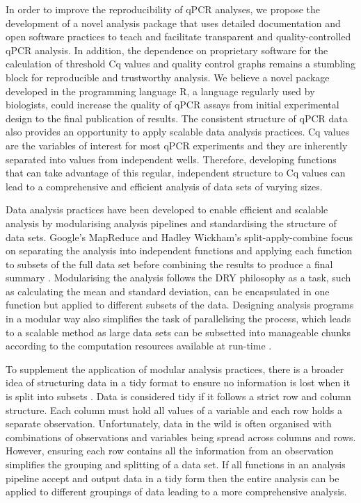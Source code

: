 \documentclass[../main.tex]{subfiles}
\begin{document}
In order to improve the reproducibility of qPCR analyses, we propose the development of a novel analysis package that uses detailed documentation and open software practices to teach and facilitate transparent and quality-controlled qPCR analysis. 
In addition, the dependence on proprietary software for the calculation of threshold Cq values and quality control graphs remains a stumbling block for reproducible and trustworthy analysis. 
We believe a novel package developed in the programming language R, a language regularly used by biologists, could increase the quality of qPCR assays from initial experimental design to the final publication of results.
The consistent structure of qPCR data also provides an opportunity to apply scalable data analysis practices.
Cq values are the variables of interest for most qPCR experiments and they are inherently separated into values from independent wells. 
Therefore, developing functions that can take advantage of this regular, independent structure to Cq values can lead to a comprehensive and efficient analysis of data sets of varying sizes.

Data analysis practices have been developed to enable efficient and scalable analysis by modularising analysis pipelines and standardising the structure of data sets.
Google's MapReduce and Hadley Wickham's split-apply-combine focus on separating the analysis into independent functions and applying each function to subsets of the full data set before combining the results to produce a final summary \parencite{Wickham2011, Dean2004}.
Modularising the analysis follows the DRY philosophy as a task, such as calculating the mean and standard deviation, can be encapsulated in one function but applied to different subsets of the data.
Designing analysis programs in a modular way also simplifies the task of parallelising the process, which leads to a scalable method as large data sets can be subsetted into manageable chunks according to the computation resources available at run-time \parencite{Chua2004}.

To supplement the application of modular analysis practices, there is a broader idea of structuring data in a tidy format to ensure no information is lost when it is split into subsets \parencite{Wickham2014}. 
Data is considered tidy if it follows a strict row and column structure. 
Each column must hold all values of a variable and each row holds a separate observation.
Unfortunately, data in the wild is often organised with combinations of observations and variables being spread across columns and rows.
However, ensuring each row contains all the information from an observation simplifies the grouping and splitting of a data set.
If all functions in an analysis pipeline accept and output data in a tidy form then the entire analysis can be applied to different groupings of data leading to a more comprehensive analysis.
\end{document}
